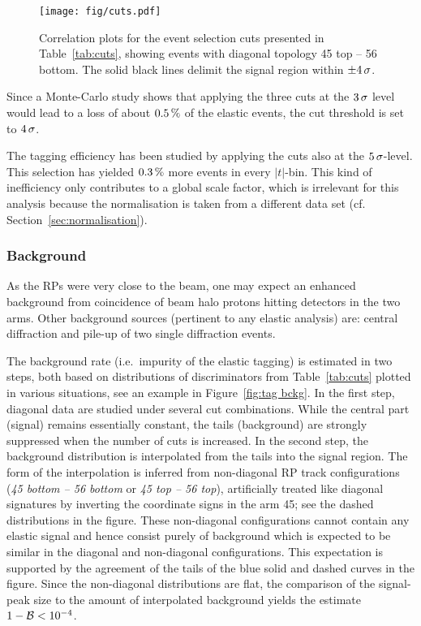 \begin{figure}
\begin{center}
\texttt{[image: fig/cuts.pdf]}
\caption{%
Correlation plots for the event selection cuts presented in Table~\ref{tab:cuts}, showing events with diagonal topology 45 top -- 56 bottom. The solid black lines delimit the signal region within $\pm 4\,{\rm \sigma}$.
}
\label{fig:cuts}
\end{center}
\end{figure}

Since a Monte-Carlo study shows that applying the three cuts at the $3\,{\rm \sigma}$ level would lead to a loss of about $0.5\,{\rm \%}$ of the elastic events, the cut threshold is set to $4\,{\rm \sigma}$.

The tagging efficiency has been studied by applying the cuts also at the $5\,{\rm \sigma}$-level. This selection has yielded $0.3\,{\rm \%}$ more events in every $|t|$-bin. This kind of inefficiency only contributes to a global scale factor, which is irrelevant for this analysis because the normalisation is taken from a different data set (cf. Section~\ref{sec:normalisation}).



\subsubsection{Background}
\label{sec:background}

As the RPs were very close to the beam, one may expect an enhanced background from coincidence of beam halo protons hitting detectors in the two arms. Other background sources (pertinent to any elastic analysis) are: central diffraction and pile-up of two single diffraction events.

The background rate (i.e.~impurity of the elastic tagging) is estimated in two steps, both based on distributions of discriminators from Table~\ref{tab:cuts} plotted in various situations, see an example in Figure~\ref{fig:tag bckg}. In the first step, diagonal data are studied under several cut combinations. While the central part (signal) remains essentially constant, the tails (background) are strongly suppressed when the number of cuts is increased. In the second step, the background distribution is interpolated from the tails into the signal region. The form of the interpolation is inferred from non-diagonal RP track configurations (\textit{45 bottom -- 56 bottom} or \textit{45 top -- 56 top}), artificially treated like diagonal signatures by inverting the coordinate signs in the arm 45; see the dashed distributions in the figure. These non-diagonal configurations cannot contain any elastic signal and hence consist purely of background which is expected to be similar in the diagonal and non-diagonal configurations. This expectation is supported by the agreement of the tails of the blue solid and dashed curves in the figure. Since the non-diagonal distributions are flat, the comparison of the signal-peak size to the amount of interpolated background yields the estimate $1 - {\cal B} < 10^{-4}$.

